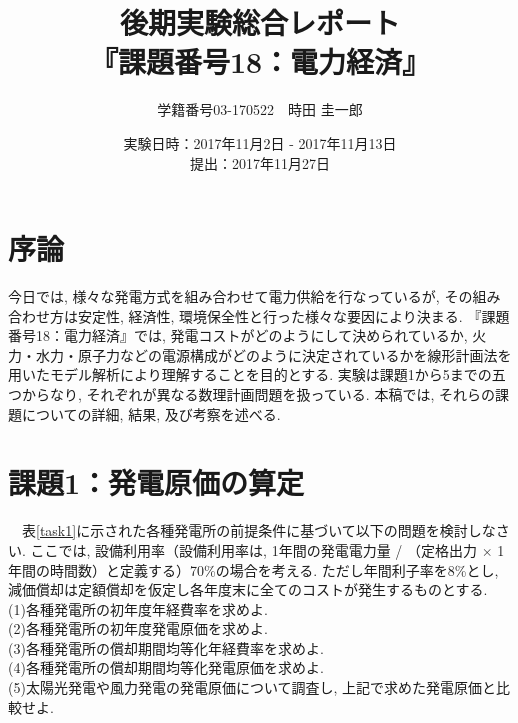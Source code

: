 \documentclass[]{jsarticle}
\title{後期実験総合レポート\\『課題番号18：電力経済』}
\author{学籍番号03-170522　時田 圭一郎}
\date{実験日時：2017年11月2日 - 2017年11月13日\\
  提出：2017年11月27日}
\begin{document}
\setcounter{section}{-1}
\maketitle

  \section{序論}
      今日では, 様々な発電方式を組み合わせて電力供給を行なっているが, その組み合わせ方は安定性, 経済性, 環境保全性と行った様々な要因により決まる. 『課題番号18：電力経済』では, 発電コストがどのようにして決められているか, 火力・水力・原子力などの電源構成がどのように決定されているかを線形計画法を用いたモデル解析により理解することを目的とする. 実験は課題1から5までの五つからなり, それぞれが異なる数理計画問題を扱っている. 本稿では, それらの課題についての詳細, 結果, 及び考察を述べる.

  \section{課題1：発電原価の算定}
    \begin{screen}
      　表\ref{task1}に示された各種発電所の前提条件に基づいて以下の問題を検討しなさい. ここでは, 設備利用率（設備利用率は, 1年間の発電電力量 / （定格出力 $\times$ 1年間の時間数）と定義する）70\%の場合を考える. ただし年間利子率を8\%とし, 減価償却は定額償却を仮定し各年度末に全てのコストが発生するものとする. \\
      (1)各種発電所の初年度年経費率を求めよ. \\
      (2)各種発電所の初年度発電原価を求めよ.\\
      (3)各種発電所の償却期間均等化年経費率を求めよ.\\
      (4)各種発電所の償却期間均等化発電原価を求めよ.\\
      (5)太陽光発電や風力発電の発電原価について調査し, 上記で求めた発電原価と比較せよ.
    \end{screen}
\end{document}

